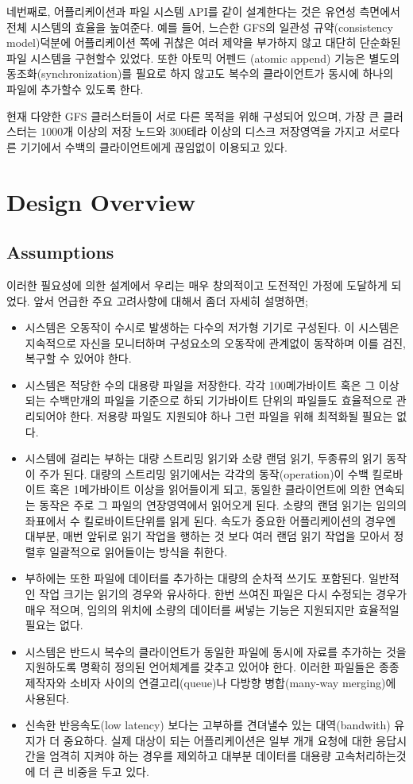 \documentclass[twocolumn]{article}
\newcommand{\bi}{\begin{itemize}}
\newcommand{\ei}{\end{itemize}}
\newcommand{\ii}{\item}
\begin{document}
  네번째로, 어플리케이션과 파일 시스템 API를 같이 설계한다는 것은 유연성 측면에서 전체 시스템의 효율을 높여준다.  예를 들어, 느슨한 GFS의 일관성 규약(consistency model)덕분에  어플리케이션 쪽에 귀찮은 여러 제약을 부가하지 않고 대단히 단순화된 파일 시스템을 구현할수 있었다.  또한 아토믹 어펜드 (atomic append) 기능은 별도의 동조화(synchronization)를 필요로 하지 않고도 복수의 클라이언트가 동시에 하나의 파일에 추가할수 있도록 한다.

  현재 다양한 GFS 클러스터들이 서로 다른 목적을 위해 구성되어 있으며, 가장 큰 클러스터는 1000개 이상의 저장 노드와 300테라 이상의 디스크 저장영역을 가지고 서로다른 기기에서 수백의 클라이언트에게 끊임없이 이용되고 있다.

\section{Design Overview}
\subsection{Assumptions}

 이러한 필요성에 의한 설계에서 우리는 매우 창의적이고 도전적인 가정에 도달하게 되었다.  앞서 언급한 주요 고려사항에 대해서 좀더 자세히 설명하면;
\bi
\ii 시스템은 오동작이 수시로 발생하는 다수의 저가형 기기로 구성된다.  이 시스템은 지속적으로 자신을 모니터하며 구성요소의 오동작에 관계없이 동작하며 이를 검진, 복구할 수 있어야 한다.
\ii 시스템은 적당한 수의 대용량 파일을 저장한다.  각각 100메가바이트 혹은 그 이상되는 수백만개의 파일을 기준으로 하되 기가바이트 단위의 파일들도 효율적으로 관리되어야 한다.  저용량 파일도 지원되야 하나 그런 파일을 위해 최적화될 필요는 없다.
\ii 시스템에 걸리는 부하는 대량 스트리밍 읽기와 소량 랜덤 읽기, 두종류의 읽기 동작이 주가 된다.  대량의 스트리밍 읽기에서는 각각의 동작(operation)이 수백 킬로바이트 혹은 1메가바이트 이상을 읽어들이게 되고, 동일한 클라이언트에 의한 연속되는 동작은 주로 그 파일의 연장영역에서 읽어오게 된다.  소량의 랜덤 읽기는 임의의 좌표에서 수 킬로바이트단위를 읽게 된다.  속도가 중요한 어플리케이션의 경우엔 대부분, 매번 앞뒤로 읽기 작업을 행하는 것 보다 여러 랜덤 읽기 작업을 모아서 정렬후 일괄적으로 읽어들이는 방식을 취한다.
\ii 부하에는 또한 파일에 데이터를 추가하는 대량의 순차적 쓰기도 포함된다.  일반적인 작업 크기는 읽기의 경우와 유사하다.  한번 쓰여진 파일은 다시 수정되는 경우가 매우 적으며,  임의의 위치에 소량의 데이터를 써넣는 기능은 지원되지만 효율적일 필요는 없다.
\ii 시스템은 반드시 복수의 클라이언트가 동일한 파일에 동시에 자료를 추가하는 것을 지원하도록 명확히 정의된 언어체계를 갖추고 있어야 한다.  이러한 파일들은 종종 제작자와 소비자 사이의 연결고리(queue)나 다방향 병합(many-way merging)에 사용된다.
\ii 신속한 반응속도(low latency) 보다는 고부하를 견뎌낼수 있는 대역(bandwith) 유지가 더 중요하다. 실제 대상이 되는 어플리케이션은 일부 개개 요청에 대한 응답시간을 엄격히 지켜야 하는 경우를 제외하고 대부분 데이터를 대용량 고속처리하는것에 더 큰 비중을 두고 있다.
\ei
\end{document}
